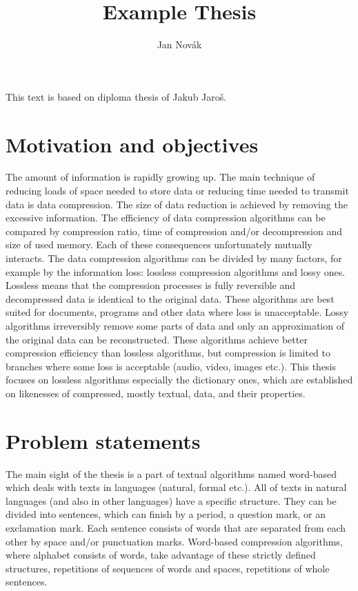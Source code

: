 \documentclass[thesis=M,english]{FITthesis}[2012/10/20]
\title{Example Thesis}
\author{Jan Nov\'ak} %
\begin{document}

\begin{introduction}
	This text is based on diploma thesis of Jakub Jaro{\v s}.
	\section{Motivation and objectives}

	The amount of information is rapidly growing up. The main technique of reducing loads of space needed to store data or reducing time needed to transmit data is data compression. The size of data reduction is achieved by removing the excessive information.
	The efficiency of data compression algorithms can be compared by compression ratio, time of compression and/or decompression and size of used memory. Each of these consequences unfortunately mutually interacts.
	The data compression algorithms can be divided by many factors, for example by the information loss: lossless compression algorithms and lossy ones. Lossless means that the compression processes is fully reversible and decompressed data is identical to the original data. These algorithms are best suited for documents, programs and other data where loss is unacceptable. Lossy algorithms irreversibly remove some parts of data and only an approximation of the original data can be reconstructed. These algorithms achieve better compression efficiency than lossless algorithms, but compression is limited to branches where some loss is acceptable (audio, video, images etc.).
	This thesis focuses on lossless algorithms especially the dictionary ones, which are established on likenesses of compressed, mostly textual, data, and their properties.

	\section{Problem statements}

	The main sight of the thesis is a part of textual algorithms named word-based which deals with texts in languages (natural, formal etc.). All of texts in natural languages (and also in other languages) have a specific structure. They can be divided into sentences, which can finish by a period, a question mark, or an exclamation mark. Each sentence consists of words that are separated from each other by space and/or punctuation marks.
	Word-based compression algorithms, where alphabet consists of words, take advantage of these strictly defined structures, repetitions of sequences of words and spaces, repetitions of whole sentences.

\end{introduction}
\end{document}
